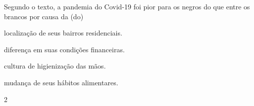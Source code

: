 Segundo o texto, a pandemia do Covid-19 foi pior para os negros do que
entre os brancos por causa da (do)

\begin{escolha}
\item localização de seus bairros residenciais.

\item diferença em suas condições financeiras.

\item cultura de higienização das mãos.

\item mudança de seus hábitos alimentares.
\end{escolha}


\pagebreak
\num{2}

